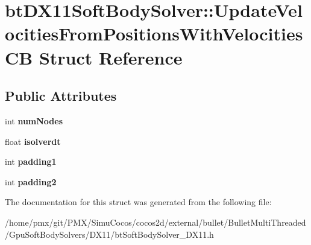\hypertarget{structbtDX11SoftBodySolver_1_1UpdateVelocitiesFromPositionsWithVelocitiesCB}{}\section{bt\+D\+X11\+Soft\+Body\+Solver\+:\+:Update\+Velocities\+From\+Positions\+With\+Velocities\+CB Struct Reference}
\label{structbtDX11SoftBodySolver_1_1UpdateVelocitiesFromPositionsWithVelocitiesCB}
\subsection*{Public Attributes}
\begin{DoxyCompactItemize}
\item 
\mbox{\label{structbtDX11SoftBodySolver_1_1UpdateVelocitiesFromPositionsWithVelocitiesCB_a12fdebb986c070a84cdf67d493a2b003}} 
int {\bfseries num\+Nodes}
\item 
\mbox{\label{structbtDX11SoftBodySolver_1_1UpdateVelocitiesFromPositionsWithVelocitiesCB_a37badca4aa94da91a998a1608bdee156}} 
float {\bfseries isolverdt}
\item 
\mbox{\label{structbtDX11SoftBodySolver_1_1UpdateVelocitiesFromPositionsWithVelocitiesCB_ac4436a1a97dab09ee74216c64f9f6b60}} 
int {\bfseries padding1}
\item 
\mbox{\label{structbtDX11SoftBodySolver_1_1UpdateVelocitiesFromPositionsWithVelocitiesCB_a5061d53cda98dc49a6a42639021d599a}} 
int {\bfseries padding2}
\end{DoxyCompactItemize}


The documentation for this struct was generated from the following file\+:\begin{DoxyCompactItemize}
\item 
/home/pmx/git/\+P\+M\+X/\+Simu\+Cocos/cocos2d/external/bullet/\+Bullet\+Multi\+Threaded/\+Gpu\+Soft\+Body\+Solvers/\+D\+X11/bt\+Soft\+Body\+Solver\+\_\+\+D\+X11.\+h\end{DoxyCompactItemize}
